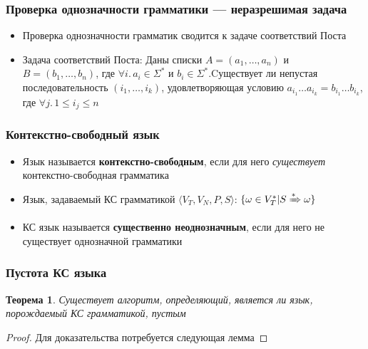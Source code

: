 \documentclass{beamer}
\newtheorem{rutheorem}{Теорема}
\begin{document}
\begin{frame}[fragile]
  \transwipe[direction=90]
  \frametitle{Проверка однозначности грамматики --- неразрешимая задача}
  \begin{itemize}
    \item Проверка однозначности грамматик сводится к задаче соответствий Поста
  \end{itemize}
    \begin{itemize}
    \item Задача соответствий Поста: Даны списки $A = (a_1, \dots, a_n)$ и $B = (b_1 ,\dots ,b_n)$, где $\forall i. \, a_i \in \Sigma ^*$ и $b_i \in \Sigma ^*$.Cуществует ли непустая последовательность $(i_1 , \dots, i_k)$, удовлетворяющая условию $a_{i_1} \dots a_{i_k} = b_{i_1} \dots b_{i_k}$, где $\forall j. \, 1 \leq i_j \leq n$
  \end{itemize}
\end{frame}


\begin{frame}[fragile]
  \transwipe[direction=90]
  \frametitle{Контекстно-свободный язык}
  \begin{itemize}
    \item Язык называется \textbf{контекстно-свободным}, если для него \emph{существует} контекстно-свободная грамматика
    \item Язык, задаваемый КС грамматикой $\langle V_T, V_N, P, S\rangle$: $\{ \omega \in V_T^* | S \xRightarrow[]{*} \omega \}$
    \item КС язык называется \textbf{существенно неоднозначным}, если для него не существует однозначной грамматики
  \end{itemize}
\end{frame}


\begin{frame}[fragile]
  \transwipe[direction=90]
  \frametitle{Пустота КС языка}
   \begin{rutheorem}
   Существует алгоритм, определяющий, является ли язык, порождаемый КС грамматикой, пустым
   \end{rutheorem}
   \begin{proof}
     Для доказательства потребуется следующая лемма
   \end{proof}
\end{frame}
  
\end{document}
